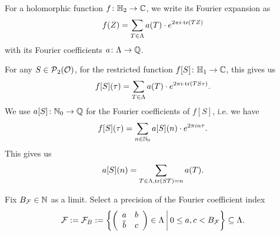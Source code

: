 For a holomorphic function $f \colon \mathbb{H}_2 \rightarrow \mathbb{C}$, we write its Fourier expansion as
\[ f(Z) = \sum_{T \in \Lambda} a(T) \cdot e^{2 \pi i \cdot \textup{\textrm{tr}}(T Z)} \]
with its Fourier coefficients $a \colon \Lambda \rightarrow \mathbb{Q}$.

For any $S \in \operatorname{\mathcal{P}}_2(\mathcal{O})$, for the restricted function $f[S] \colon \mathbb{H}_1 \rightarrow \mathbb{C}$, this gives us
\[ f[S](\tau) = \sum_{T \in \Lambda} a(T) \cdot e^{2 \pi i \cdot \textup{\textrm{tr}}(T S \tau)} . \]
We use $a[S] \colon \mathbb{N}_0 \rightarrow \mathbb{Q}$ for the Fourier coefficients of $f[S]$, i.e. we have
\[ f[S](\tau) = \sum_{n \in \mathbb{N}_0} a[S](n) \cdot e^{2 \pi i n \tau} . \]
This gives us
\[ a[S] (n) = \sum_{T \in \Lambda, \textup{\textrm{tr}}(S T) = n} a(T) . \]

Fix $B_{\mathcal{F}} \in \mathbb{N}$ as a limit. Select a precision of the Fourier coefficient index
\[ \F := \F_B := \Set{\SimpleMatrix{a}{b}{\overline b}{c} \in \Lambda}{0 \le a , c < B_{\F}} \subseteq \Lambda . \]

